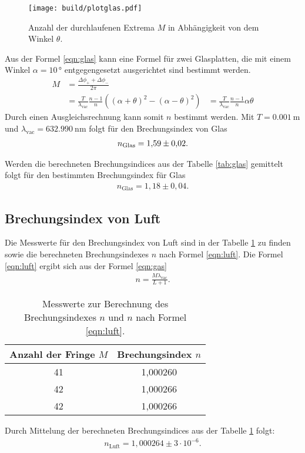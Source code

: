 \begin{figure}
    \centering
    \texttt{[image: build/plotglas.pdf]}
    \caption{Anzahl der durchlaufenen Extrema $M$ in Abhängigkeit von dem Winkel $\theta$.}
    \label{fig:glas}
\end{figure}

Aus der Formel \eqref{eqn:glas} kann eine Formel für
zwei Glasplatten, die mit einem Winkel $\alpha=10\,\si{\degree}$ entgegengesetzt
ausgerichtet sind bestimmt werden.
\begin{align}
  M&=\frac{\Delta \phi_+ +\Delta \phi_-}{2\pi}\\
    &=\frac{T}{\lambda_\mathrm{vac}}\frac{n-1}{n}((\alpha+\theta)^2-(\alpha-\theta)^2)
    &=\frac{T}{\lambda_\mathrm{vac}}\frac{n-1}{n} \alpha \theta
\end{align}
Durch einen Ausgleichsrechnung kann somit $n$ bestimmt werden.
Mit $T=\SI{0,001}{\meter}$ und $\lambda_\mathrm{vac}=\SI{632.990}{\nano\meter}$
folgt für den Brechungsindex von Glas
\begin{align}
n_\mathrm{Glas}=\num{1,59\pm0,02}.
\end{align}



Werden die berechneten Brechungsindices aus der Tabelle \ref{tab:glas} gemittelt folgt für den
bestimmten Brechungsindex für Glas
\begin{align*}
  n_\mathrm{Glas}=1,18\pm0,04.
\end{align*}


\subsection{Brechungsindex von Luft}
Die Messwerte für den Brechungsindex von Luft sind in der Tabelle \ref{tab:luft}
zu finden sowie die berechneten Brechungsindexes $n$ nach Formel \eqref{eqn:luft}.
Die Formel \eqref{eqn:luft} ergibt sich aus der Formel \eqref{eqn:gas}
\begin{align}%
    n=\frac{M\lambda_\mathrm{vac}}{L+1} \label{eqn:luft}.
\end{align}

\begin{table}
\centering
\caption{Messwerte zur Berechnung des Brechungsindexes $n$ und $n$ nach Formel \eqref{eqn:luft}.}
\label{tab:luft}
\begin{tabular}{c c}
\toprule
  Anzahl der Fringe $M$ & Brechungsindex $n$ \\
\midrule
41 &  1,000260\\
42 &  1,000266\\
42 &  1,000266\\
\bottomrule
\end{tabular}
\end{table}
Durch Mittelung der berechneten Brechungsindices aus der Tabelle \ref{tab:luft}
folgt:
\begin{align*}
  n_\mathrm{Luft}=1,000264\pm 3\cdot10^{-6}.
\end{align*}

